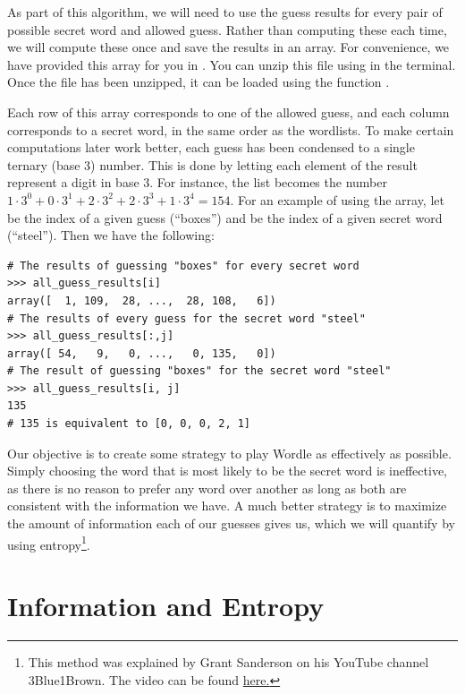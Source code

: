 As part of this algorithm, we will need to use the guess results for every pair of possible secret word and allowed guess.
Rather than computing these each time, we will compute these once and save the results in an array.
For convenience, we have provided this array for you in .
You can unzip this file using  in the terminal.
Once the file has been unzipped, it can be loaded using the function .

Each row of this array corresponds to one of the allowed guess, and each column corresponds to a secret word, in the same order as the wordlists.
To make certain computations later work better, each guess has been condensed to a single ternary (base 3) number.
This is done by letting each element of the result represent a digit in base 3.
For instance, the list \li{[1,0,2,2,1]} becomes the number \(1\cdot 3^0 + 0\cdot 3^1+2\cdot 3^2+2\cdot 3^3+1\cdot 3^4=154\).
For an example of using the array, let  be the index of a given guess (``boxes'') and  be the index of a given secret word (``steel'').
Then we have the following:
\begin{lstlisting}
# The results of guessing "boxes" for every secret word
>>> all_guess_results[i]
array([  1, 109,  28, ...,  28, 108,   6])
# The results of every guess for the secret word "steel"
>>> all_guess_results[:,j]
array([ 54,   9,   0, ...,   0, 135,   0])
# The result of guessing "boxes" for the secret word "steel"
>>> all_guess_results[i, j]
135
# 135 is equivalent to [0, 0, 0, 2, 1]
\end{lstlisting}

Our objective is to create some strategy to play Wordle as effectively as possible.
Simply choosing the word that is most likely to be the secret word is ineffective, as there is no reason to prefer any word over another as long as both are consistent with the information we have.
A much better strategy is to maximize the amount of information each of our guesses gives us, which we will quantify by using entropy\footnote{This method was explained by Grant Sanderson on his YouTube channel 3Blue1Brown. The video can be found \href{https://youtu.be/v68zYyaEmEA?si=4ac5QErmPipLOAUw}{here.}}.


\section*{Information and Entropy}

